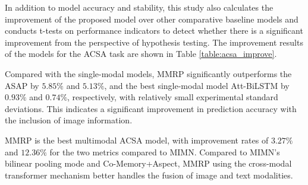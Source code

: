 \documentclass[preprint,12pt]{elsarticle}
\begin{document}
In addition to model accuracy and stability, this study also calculates the improvement of the proposed model over other comparative baseline models and conducts t-tests on performance indicators to detect whether there is a significant improvement from the perspective of hypothesis testing. The improvement results of the models for the ACSA task are shown in Table \ref{table:acsa_improve}. 

Compared with the single-modal models, MMRP significantly outperforms the ASAP by $5.85\%$ and $5.13\%$, and the best single-modal model Att-BiLSTM by $0.93\%$ and $0.74\%$, respectively, with relatively small experimental standard deviations. This indicates a significant improvement in prediction accuracy with the inclusion of image information.

 MMRP is the best multimodal ACSA model, with improvement rates of $3.27\%$ and $12.36\%$ for the two metrics compared to MIMN. Compared to MIMN's bilinear pooling mode and Co-Memory+Aspect, MMRP using the cross-modal transformer mechanism better handles the fusion of image and text modalities.
\end{document}
